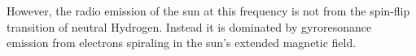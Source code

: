 However, the radio emission of the sun at this frequency is not from the spin-flip transition of neutral Hydrogen.
Instead it is dominated by gyroresonance emission from electrons spiraling in the sun's extended magnetic field.
